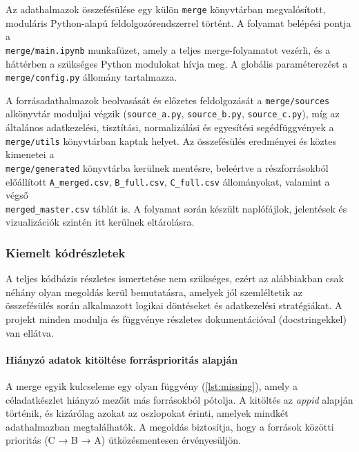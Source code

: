 Az adathalmazok összefésülése egy külön \texttt{merge} könyvtárban
megvalósított, moduláris Python-alapú feldolgozórendszerrel történt. A
folyamat belépési pontja a \\
\texttt{merge/main.ipynb} munkafüzet, amely a teljes merge-folyamatot vezérli, és a háttérben a szükséges Python
modulokat hívja meg. A globális paraméterezést a \\
 \texttt{merge/config.py} állomány tartalmazza.

A forrásadathalmazok beolvasását és előzetes feldolgozását a
\texttt{merge/sources} alkönyvtár moduljai végzik
(\texttt{source\_a.py}, \texttt{source\_b.py}, \texttt{source\_c.py}),
míg az általános adatkezelési, tisztítási, normalizálási és egyesítési
segédfüggvények a \texttt{merge/utils} könyvtárban kaptak helyet. Az
összefésülés eredményei és köztes kimenetei a \\
\texttt{merge/generated} könyvtárba kerülnek mentésre, beleértve a részforrásokból előállított
\texttt{A\_merged.csv}, \texttt{B\_full.csv}, \texttt{C\_full.csv}
állományokat, valamint a végső \\
 \texttt{merged\_master.csv} táblát is. A folyamat során készült naplófájlok, jelentések és vizualizációk szintén
itt kerülnek eltárolásra.

\subsubsection{Kiemelt kódrészletek}

A teljes kódbázis részletes ismertetése nem szükséges, ezért az alábbiakban csak néhány olyan megoldás kerül bemutatásra, amelyek jól szemléltetik az összefésülés során alkalmazott logikai döntéseket és adatkezelési stratégiákat. A projekt minden modulja és függvénye részletes dokumentációval (docstringekkel) van ellátva.

\paragraph{Hiányzó adatok kitöltése forrásprioritás alapján}

A merge egyik kulcseleme egy olyan függvény (\ref{lst:missing}), amely a céladatkészlet hiányzó mezőit más forrásokból pótolja. A kitöltés az \textit{appid} alapján történik, és kizárólag azokat az oszlopokat érinti, amelyek mindkét adathalmazban megtalálhatók. A megoldás biztosítja, hogy a források közötti prioritás (C → B → A) ütközésmentesen érvényesüljön.

